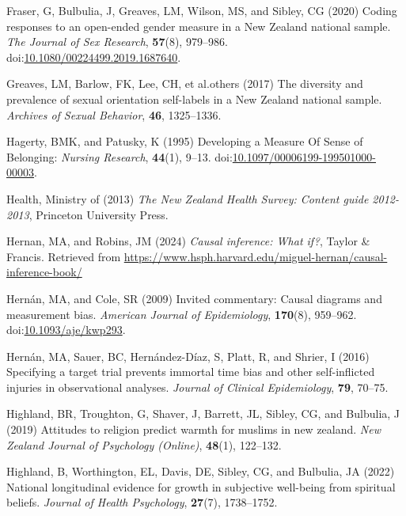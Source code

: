 \documentclass[
  single column]{article}
\newlength{\cslhangindent}
\newenvironment{CSLReferences}[2] %
 {\begin{list}{}{%
  \setlength{\itemindent}{0pt}
  \setlength{\leftmargin}{0pt}
  \setlength{\parsep}{0pt}
  \ifodd #1
   \setlength{\leftmargin}{\cslhangindent}
   \setlength{\itemindent}{-1\cslhangindent}
  \fi
  \setlength{\itemsep}{#2\baselineskip}}}
 {\end{list}}
\begin{document}
\begin{CSLReferences}{1}{0}
Fraser, G, Bulbulia, J, Greaves, LM, Wilson, MS, and Sibley, CG (2020)
Coding responses to an open-ended gender measure in a {N}ew {Z}ealand
national sample. \emph{The Journal of Sex Research}, \textbf{57}(8),
979--986.
doi:\href{https://doi.org/10.1080/00224499.2019.1687640}{10.1080/00224499.2019.1687640}.

Greaves, LM, Barlow, FK, Lee, CH, et al.others (2017) The diversity and
prevalence of sexual orientation self-labels in a {N}ew {Z}ealand
national sample. \emph{Archives of Sexual Behavior}, \textbf{46},
1325--1336.

Hagerty, BMK, and Patusky, K (1995) Developing a Measure Of Sense of
Belonging: \emph{Nursing Research}, \textbf{44}(1), 9--13.
doi:\href{https://doi.org/10.1097/00006199-199501000-00003}{10.1097/00006199-199501000-00003}.

Health, Ministry of (2013) \emph{The {N}ew {Z}ealand {H}ealth {S}urvey:
Content guide 2012-2013}, Princeton University Press.

Hernan, MA, and Robins, JM (2024) \emph{Causal inference: What if?},
Taylor \& Francis. Retrieved from
\url{https://www.hsph.harvard.edu/miguel-hernan/causal-inference-book/}

Hernán, MA, and Cole, SR (2009) Invited commentary: Causal diagrams and
measurement bias. \emph{American Journal of Epidemiology},
\textbf{170}(8), 959--962.
doi:\href{https://doi.org/10.1093/aje/kwp293}{10.1093/aje/kwp293}.

Hernán, MA, Sauer, BC, Hernández-Díaz, S, Platt, R, and Shrier, I (2016)
Specifying a target trial prevents immortal time bias and other
self-inflicted injuries in observational analyses. \emph{Journal of
Clinical Epidemiology}, \textbf{79}, 70--75.

Highland, BR, Troughton, G, Shaver, J, Barrett, JL, Sibley, CG, and
Bulbulia, J (2019) Attitudes to religion predict warmth for muslims in
new zealand. \emph{New Zealand Journal of Psychology (Online)},
\textbf{48}(1), 122--132.

Highland, B, Worthington, EL, Davis, DE, Sibley, CG, and Bulbulia, JA
(2022) National longitudinal evidence for growth in subjective
well-being from spiritual beliefs. \emph{Journal of Health Psychology},
\textbf{27}(7), 1738--1752.


\end{CSLReferences}
\end{document}
